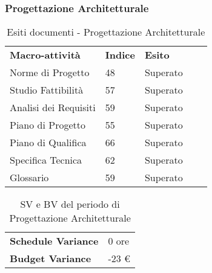 \subsubsection{Progettazione Architetturale}
\begin{table}[H]
			\centering
				\begin{tabular}{|l|l|l|ll}
					\cline{1-3}
					 \textbf{Macro-attività}  & \textbf{Indice \glossaryItem{Gulpease}}  & \textbf{Esito}  &  \\ \cline{1-3}
					 Norme di Progetto & 48 & Superato &  \\ \cline{1-3}
					 Studio Fattibilità & 57 & Superato &  \\ \cline{1-3}
					 Analisi dei Requisiti & 59 & Superato &  \\ \cline{1-3}
					 Piano di Progetto & 55 & Superato &  \\ \cline{1-3}
					 Piano di Qualifica & 66 & Superato &  \\ \cline{1-3}
					 Specifica Tecnica & 62 & Superato & \\ \cline{1-3}
					 Glossario & 59 & Superato &  \\ \cline{1-3}
				\end{tabular}
				\caption{Esiti  documenti - Progettazione Architetturale}
		\end{table}
		\begin{table}[H]
		\centering
		\begin{tabular}{|l|l|}
		\cline{1-2}
		\textbf{Schedule Variance} & 0 ore \\ \cline{1-2}
		\textbf{Budget Variance} & -23 \euro{} \\ \cline{1-2}
		\end{tabular}
		\caption{SV e BV del periodo di Progettazione Architetturale}
		\end{table}

